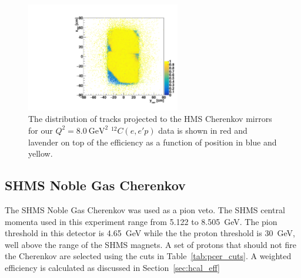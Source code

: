 \begin{figure}[!h]
    \centering
    \includegraphics[width=0.6\textwidth]{chap4/plot_scripts/hCer_eff_short_pal.pdf}
    \caption{
            The distribution of tracks projected to the HMS Cherenkov mirrors
            for our $Q^2=\SI{8.0}{\giga\electronvolt\squared}$ ${}^{12}C(e,e'p)$
            data is shown in red and lavender
            on top of the
            efficiency as a function of position in blue and yellow.
            }
    \label{fig:hms_mirror_c12_tracks}
\end{figure}


\subsection{SHMS Noble Gas Cherenkov}
The SHMS Noble Gas Cherenkov was used as a pion veto.
The SHMS central momenta used in this experiment range from
5.122 to \SI{8.505}{\giga\electronvolt}.
The pion threshold in this detector is \SI{4.65}{\giga\electronvolt} while the
the proton threshold is \SI{30}{\giga\electronvolt}, well above the range of
the SHMS magnets.
A set of protons that should not fire the Cherenkov
are selected using the cuts in Table~\ref{tab:pcer_cuts}.
A weighted efficiency is calculated as discussed in Section~\ref{sec:hcal_eff}

